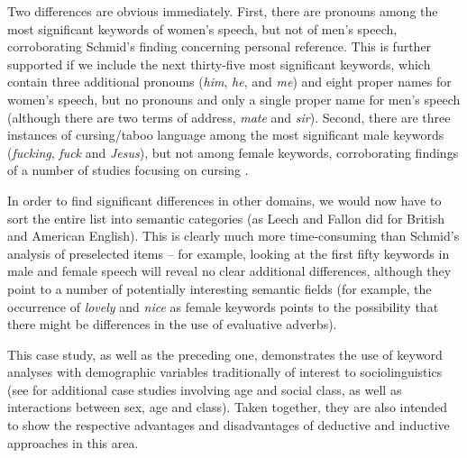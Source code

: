 Two differences are obvious immediately. First, there are pronouns  among the most significant keywords  of women's speech, but not of men's speech, corroborating Schmid's finding concerning personal reference. This is further supported if we include the next thirty\hyp{}five most significant keywords, which contain three additional pronouns  (\textit{him}, \textit{he}, and \textit{me}) and eight proper names for women's speech, but no pronouns  and only a single proper name for men's speech (although there are two terms of address, \textit{mate} and \textit{sir}).  Second, there are three instances of cursing\slash taboo language among the most significant male keywords (\textit{fucking}, \textit{fuck} and \textit{Jesus}), but not among female keywords,  corroborating findings of a number of studies focusing on cursing \citep[cf.][]{murphy_shes_2009}.

In order to find significant differences in other domains, we would now have to sort the entire list into semantic  categories  (as Leech and Fallon did for British  and American  English). This is clearly much more time\hyp{}consuming than Schmid's analysis of preselected items -- for example, looking at the first fifty keywords  in male and female speech will reveal no clear additional differences,  although they point to a number of potentially interesting semantic fields (for example, the occurrence of \textit{lovely} and \textit{nice} as female keywords points to the possibility that there might be differences in the use of evaluative  adverbs).

This case study, as well as the preceding one, demonstrates the use of keyword  analyses with demographic  variables traditionally of interest to sociolinguistics  (see \citealt{rayson_social_1997} for additional case studies involving age  and social class, as well as interactions between sex, age  and class). Taken together, they are also intended to show the respective advantages and disadvantages of deductive  and inductive  approaches in this area.

